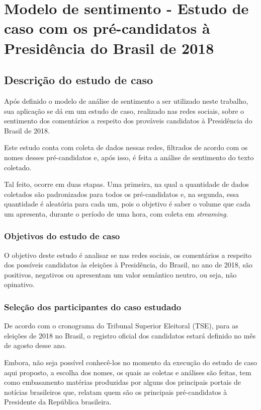 \chapter{Modelo de sentimento - Estudo de caso com os pré-candidatos à Presidência do Brasil de 2018}

\section{Descrição do estudo de caso}

Após definido o modelo de análise de sentimento a ser utilizado neste trabalho, sua aplicação se dá em um estudo de caso, realizado nas redes sociais, sobre o sentimento dos comentários a respeito dos prováveis candidatos à Presidência do Brasil de 2018. 

Este estudo conta com coleta de dados nessas redes, filtrados de acordo com os nomes desses pré-candidatos e, após isso, é feita a análise de sentimento do texto coletado.

Tal feito, ocorre em duas etapas. Uma primeira, na qual a quantidade de dados coletados são padronizados para todos os pré-candidatos e, na segunda, essa quantidade é aleatória para cada um, pois o objetivo é saber o volume que cada um apresenta, durante o período de uma hora, com coleta em \textit{streaming}.

\subsection{Objetivos do estudo de caso}

O objetivo deste estudo é analisar se nas redes sociais, os comentários a respeito dos possíveis candidatos às eleições à Presidência, do Brasil, no ano de 2018, são positivos, negativos ou apresentam um valor semântico neutro, ou seja, não opinativo.

\subsection{Seleção dos participantes do caso estudado}

De acordo com o cronograma do Tribunal Superior Eleitoral (TSE), para as eleições de 2018 no Brasil, o registro oficial dos candidatos estará definido no mês de agosto desse ano. 

Embora, não seja possível conhecê-los no momento da execução do estudo de caso aqui proposto, a escolha dos nomes, os quais as coletas e análises são feitas, tem como embasamento matérias produzidas por alguns dos principais portais de notícias brasileiros que, relatam quem são os principais pré-candidatos à Presidente da República brasileira. 

